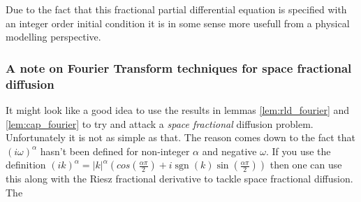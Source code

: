 Due to the fact that this fractional partial differential equation is specified with an integer order initial condition it is in some sense more usefull from a physical modelling perspective. 

\subsubsection{A note on Fourier Transform techniques for space fractional diffusion}
It might look like a good idea to use the results in lemmas \ref{lem:rld_fourier} and \ref{lem:cap_fourier} to try and attack a \emph{space fractional} diffusion problem. Unfortunately it is not as simple as that. The reason comes down to the fact that $ (i\omega)^\alpha $ hasn't been defined for non-integer $ \alpha $ and negative $ \omega $. If you use the definition $  (ik)^\alpha = |k|^\alpha\left(cos\left(\frac{\alpha\pi}{2}\right) + i\operatorname{sgn}(k)\sin\left(\frac{\alpha\pi}{2}\right)\right) $ then one can use this along with the Riesz fractional derivative to tackle space fractional diffusion. The 
\clearpage
